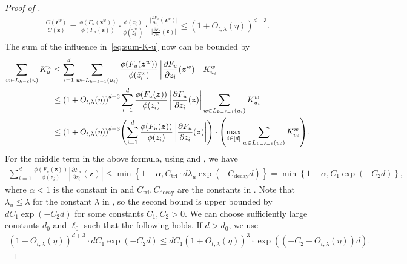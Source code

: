 \documentclass[11pt]{amsart}
\newcommand{\tp}[1]{{\left( #1 \right)}}
\theoremstyle{definition}
\theoremstyle{remark}
\begin{document}
\begin{proof}[Proof of ]
\begin{align*}
    \frac{C(\boldsymbol{z}^w)}{C(\boldsymbol{z})} = \frac{\phi(F_u(\boldsymbol{z}^w))}{\phi(F_u(\boldsymbol{z}))} \cdot \frac{\phi(z_i)}{\phi(\tilde{z}_i^w)} \cdot \frac{\bigl| \frac{\partial F_u}{\partial z_i}(\boldsymbol{z}^w) \bigr|}{\bigl| \frac{\partial F_u}{\partial z_i}(\boldsymbol{z}) \bigr|} \leq \tp{1 + O_{t,\lambda} (\eta)}^{d+3}.
\end{align*}
The sum of the influence in~\eqref{eq:sum-K-u} now can be bounded by
\begin{align}\label{eq:sum-K-u-bound}
    \sum_{w \in L_{k-\ell}(u)} K_u^w &\leq \sum_{i=1}^d \sum_{w \in L_{k-\ell-1}(u_i)} \frac{\phi(F_u(\boldsymbol{z}^w))}{\phi(\tilde{z}_i^w)} \left | \frac{\partial F_u}{\partial z_i}(\boldsymbol{z}^w) \right | \cdot K_{u_i}^w \\
    &\leq \tp{1 + O_{t,\lambda} (\eta)}^{d+3} \sum_{i=1}^d \frac{\phi(F_u(\boldsymbol{z}))}{\phi(z_i)} \left | \frac{\partial F_u}{\partial z_i}(\boldsymbol{z}) \right | \sum_{w \in L_{k-\ell-1}(u_i)} K_{u_i}^w \notag \\
    &\leq \tp{1 + O_{t,\lambda} (\eta)}^{d+3}\tp{\sum_{i=1}^d \frac{\phi(F_u(\boldsymbol{z}))}{\phi(z_i)} \left | \frac{\partial F_u}{\partial z_i}(\boldsymbol{z}) \right |} \cdot \tp{\max_{i \in [d]} \sum_{w \in L_{k-\ell-1}(u_i)} K_{u_i}^w}.\notag
\end{align}
For the middle term in the above formula, using  and , we have 
\begin{align*}
    \sum_{i=1}^d \frac{\phi(F_u(\boldsymbol{z}))}{\phi(z_i)} \left | \frac{\partial F_u}{\partial z_i}(\boldsymbol{z}) \right | \leq \min \left\{ 1 - \alpha,  C_{\text{trl}} \cdot  d\lambda_u  \exp(-C_{\text{decay}} d) \right\} = \min \left\{1 - \alpha, C_1 \exp(-C_2 d)\right\},
\end{align*}
where $\alpha < 1$ is the constant in  and $C_{\text{trl}}, C_{\text{decay}}$ are the constants in .
Note that $\lambda_u \leq \lambda$ for the constant $\lambda$ in , so the second bound is upper bounded by $dC_1 \exp(-C_2 d)$ for some constants $C_1, C_2 > 0$. We can choose sufficiently large constants $d_0$ and $\ell_0$ such that the following holds. 
If $d > d_0$, we use
\begin{align*}
     (1+O_{t,\lambda} (\eta))^{d+3} \cdot d C_1 \exp(-C_2 d)\leq d C_1 (1+O_{t,\lambda} (\eta))^{3} \cdot \exp((-C_2+ O_{t,\lambda} (\eta)) d).
\end{align*}

\end{proof}
\end{document}
